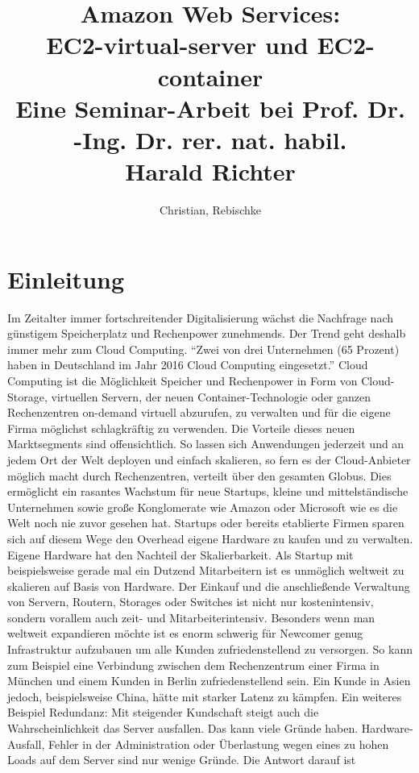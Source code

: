 \documentclass[titlepage]{report}
\title{Amazon Web Services:\\ EC2\hyp{}virtual\hyp{}server und EC2\hyp{}container \\
\small Eine Seminar\hyp{}Arbeit bei Prof. Dr. -Ing. Dr. rer. nat. habil. \\
Harald Richter}
\author{Christian, Rebischke}
\begin{document}
\maketitle
\tableofcontents
\chapter*{Einleitung}
Im Zeitalter immer fortschreitender Digitalisierung wächst die Nachfrage
nach günstigem Speicherplatz und Rechenpower zunehmends. Der Trend geht
deshalb immer mehr zum Cloud Computing.  ``Zwei von drei Unternehmen (65
Prozent) haben in Deutschland im Jahr 2016 Cloud Computing
eingesetzt.''\cite{SWG17} Cloud Computing ist die Möglichkeit
Speicher und Rechenpower in Form von Cloud\hyp{}Storage, virtuellen Servern,
der neuen Container\hyp{}Technologie oder ganzen Rechenzentren on\hyp{}demand
virtuell abzurufen, zu verwalten und für die eigene Firma möglichst
schlagkräftig zu verwenden. Die Vorteile dieses neuen Marktsegments sind
offensichtlich. So lassen sich Anwendungen jederzeit und an jedem Ort
der Welt deployen und einfach skalieren, so fern es der Cloud\hyp{}Anbieter
möglich macht durch Rechenzentren, verteilt über den gesamten Globus.
Dies ermöglicht ein rasantes Wachstum für neue Startups, kleine und
mittelständische Unternehmen sowie große Konglomerate wie Amazon oder
Microsoft wie es die Welt noch nie zuvor gesehen hat. Startups oder
bereits etablierte Firmen sparen sich auf diesem Wege den Overhead
eigene Hardware zu kaufen und zu verwalten.  Eigene Hardware hat den
Nachteil der Skalierbarkeit. Als Startup mit beispielsweise gerade mal
ein Dutzend Mitarbeitern ist es unmöglich weltweit zu skalieren auf
Basis von Hardware. Der Einkauf und die anschließende Verwaltung von
Servern, Routern, Storages oder Switches ist nicht nur kostenintensiv,
sondern vorallem auch zeit\hyp{} und Mitarbeiterintensiv.\cite[S.
1]{RZ17} Besonders wenn man weltweit expandieren möchte ist es enorm
schwerig für Newcomer genug Infrastruktur aufzubauen um alle Kunden
zufriedenstellend zu versorgen.  So kann zum Beispiel eine Verbindung
zwischen dem Rechenzentrum einer Firma in München und einem Kunden in
Berlin zufriedenstellend sein. Ein Kunde in Asien jedoch, beispielsweise
China, hätte mit starker Latenz zu kämpfen. Ein weiteres Beispiel
Redundanz: Mit steigender Kundschaft steigt auch die Wahrscheinlichkeit
das Server ausfallen. Das kann viele Gründe haben. Hardware\hyp{}Ausfall,
Fehler in der Administration oder Überlastung wegen eines zu hohen Loads
auf dem Server sind nur wenige Gründe. Die Antwort darauf ist
\end{document}
